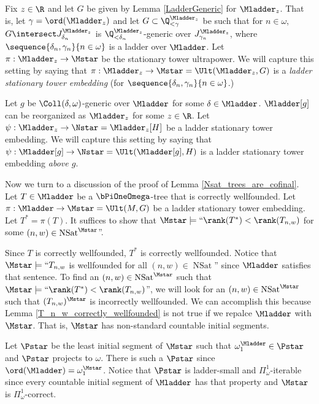\documentclass[oneside,12pt]{amsart}
\DeclareMathOperator{\NSat}{NSat}
\begin{document}
\begin{definition}
\label{LadderStationaryTowerEmbedding}
Fix $z\in\R$ and let $G$ be given by Lemma \ref{LadderGeneric} for $\Mladder_z$. That is,
let $\gamma=\ord(\Mladder_z)$ and let $G\subset \Q_{<\gamma}^{\Mladder_z}$ be such that for
$n\in\omega$, $G\intersect J^{\Mladder_z}_{\delta_n}$ is
$\Q_{<\delta_n}^{\Mladder_z}$-generic over $J^{\Mladder_z}_{\gamma_n}$, where
$\sequence{\delta_n,\gamma_n}{n\in\omega}$ is a ladder over $\Mladder$.
Let $\pi:\Mladder_z\to\Mstar$ be the stationary tower ultrapower.
We will capture this setting by saying that  $\pi:\Mladder_z\to\Mstar=\Ult(\Mladder_z,G)$
is a \emph{ladder stationary tower embedding} (for $\sequence{\delta_n,\gamma_n}{n\in\omega}$.)

Let $g$ be $\Coll(\delta,\omega)$-generic over $\Mladder$ for some
$\delta\in\Mladder$.
$\Mladder[g]$ can be reorganized as $\Mladder_z$ for some $z\in\R$.
Let $\psi:\Mladder_z\to\Nstar=\Mladder_z[H]$ be a ladder stationary tower embedding.
We will capture this setting by saying that
$\psi:\Mladder[g]\to\Nstar=\Ult(\Mladder[g],H)$ is a ladder stationary tower embedding \emph{above $g$}.
\end{definition}

Now we turn to a discussion of the proof of Lemma \ref{Nsat_trees_are_cofinal}.
Let $T\in\Mladder$ be a $\bPiOneOmega$-tree that is correctly wellfounded.
Let $\pi:\Mladder\to\Mstar=\Ult(M,G)$ be a ladder stationary tower embedding.
Let $T^* = \pi(T)$. It suffices to show that
$\Mstar\models\text{``}\rank(T^*) < \rank(T_{n,w})$ for some $(n,w)\in \NSat^{\Mstar}$''.

Since $T$ is correctly wellfounded, $T^*$ is correctly wellfounded.
Notice that $\Mstar\models\text{``}T_{n,w}$ is wellfounded for all $(n,w)\in \NSat$''
since $\Mladder$ satisfies that sentence. To find an $(n,w)\in \NSat^{\Mstar}$ such that
$\Mstar\models\text{``}\rank(T^*) < \rank(T_{n,w})$'', we will look for an
$(n,w)\in \NSat^{\Mstar}$
such that $(T_{n,w})^{\Mstar}$ is incorrectly wellfounded.
We can accomplish this because Lemma \ref{T_n_w_correctly_wellfounded} is not
true if we repalce $\Mladder$ with $\Mstar$. That is, $\Mstar$ has non-standard
countable initial segments.

Let $\Pstar$ be the least initial segment of $\Mstar$ such that
$\omega_1^{\Mladder}\in\Pstar$ and
$\Pstar$ projects to $\omega$. There is such a $\Pstar$ since
$\ord(\Mladder)=\omega_1^{\Mstar}$. Notice that $\Pstar$ is ladder-small and
$\Pi^1_{\omega}$-iterable since every countable initial segment of $\Mladder$
has that property and $\Mstar$ is $\Pi^1_{\omega}$-correct.
\end{document}
